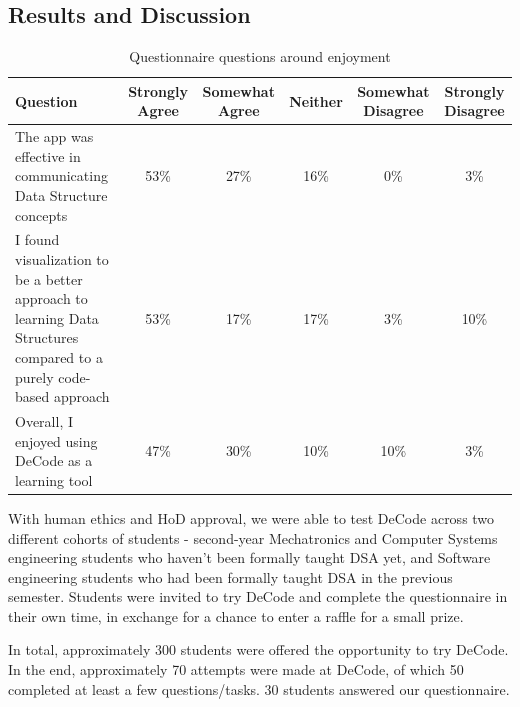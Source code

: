 \documentclass[10pt]{article}
\begin{document}
\subsection{Results and Discussion}
\begin{table}[]
  \begin{tabulary}{\linewidth}{|L|C|C|C|C|C|}
  \hline
  \textbf{Question}                                                                                                  & \textbf{Strongly Agree} & \textbf{Somewhat Agree} & \textbf{Neither} & \textbf{Somewhat Disagree} & \textbf{Strongly Disagree} \\ \hline
  The app was effective in communicating Data Structure concepts                                                     & 53\%                    & 27\%                    & 16\%             & 0\%                        & 3\%                        \\ \hline
  I found visualization to be a better approach to learning Data Structures compared to a purely code-based approach & 53\%                    & 17\%                    & 17\%             & 3\%                        & 10\%                       \\ \hline
  Overall, I enjoyed using DeCode as a learning tool                                                                 & 47\%                    & 30\%                    & 10\%             & 10\%                       & 3\%                        \\ \hline
  \end{tabulary}
  \caption{Questionnaire questions around enjoyment}
  \label{tab:enjoytable}
\end{table}
With human ethics and HoD approval, we were able to test DeCode across two different cohorts of students - second-year Mechatronics and Computer Systems engineering students who haven't been formally taught DSA yet, and Software engineering students who had been formally taught DSA in the previous semester. Students were invited to try DeCode and complete the questionnaire in their own time, in exchange for a chance to enter a raffle for a small prize.\par
In total, approximately 300 students were offered the opportunity to try DeCode. In the end, approximately 70 attempts were made at DeCode, of which 50 completed at least a few questions/tasks. 30 students answered our questionnaire.
\end{document}
